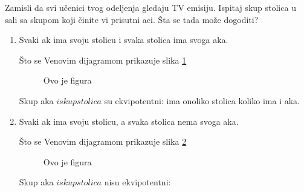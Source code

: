     

    \begin{zad} 

    Zamisli da svi u\v cenici tvog odeljenja gledaju TV emisiju. Ispitaj skup stolica u sali sa skupom koji \v cinite vi prisutni \dj aci. \v Sta se tada mo\v ze dogoditi?

       

    \end{zad}

       \begin{enumerate}

           \item Svaki \dj ak ima svoju stolicu i svaka stolica ima svoga \dj aka.



            \v Sto se Venovim dijagramom prikazuje slika \ref{slika1str27}

                   \begin{figure}[h]

                       \center


                       \caption{Ovo je figura}\label{slika1str27}

                    \end{figure} 

            

            

            Skup \dj aka $ i skup stolica $ su ekvipotentni: ima onoliko stolica koliko ima i \dj aka.



           \item Svaki \dj ak ima svoju stolicu, a svaka stolica nema svoga \dj aka.



            \v Sto se Venovim dijagramom prikazuje slika \ref{slika2str27}

                    \begin{figure}[h]

                       \center


                       \caption{Ovo je figura}\label{slika2str27}

                    \end{figure} 



            Skup \dj aka $ i skup stolica $ nisu ekvipotentni:




\end{enumerate}
